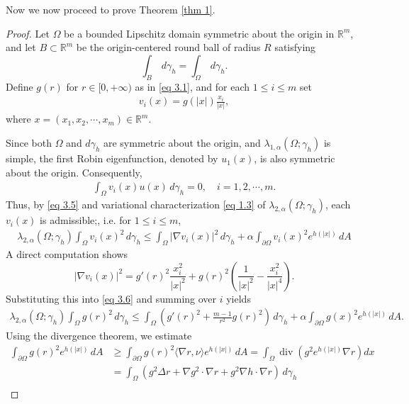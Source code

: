 \documentclass[11pt,leqno]{amsart}
\def\a{\alpha}
\def\l{\lambda}
\def\p{\partial}
\def\R{\mathbb{R}}
\def\div{\operatorname{div}}
\def \p {\partial}
\numberwithin{equation}{section}
\begin{document}
Now we now proceed to prove Theorem \ref{thm 1}.
\begin{proof}
 Let $\Omega$ be a bounded Lipschitz domain symmetric about the origin in $\R^m$, and let $B\subset \R^m$ be the origin-centered round ball of radius $R$ satisfying 
 $$
\int_B \, d\gamma_h =\int_\Omega \, d\gamma_h.
 $$
Define $g(r)$ for $r\in [0, +\infty)$ as in \eqref{eq 3.1}, and for each $1\le i\le m$ set
\begin{align*}
    v_i(x)=g(|x|)\frac{x_i}{|x|}, 
\end{align*}
where $x=(x_1, x_2, \cdots, x_m)\in \R^m$.

Since  both $\Omega$ and $d\gamma_h$ are symmetric about the origin, and $\l_{1, \a}(\Omega;\gamma_h)$ is simple,  the first Robin eigenfunction, denoted by $u_1(x)$, is also symmetric about the origin. Consequently,
     \begin{align}\label{eq 3.5}
        \int_\Omega v_i(x)u(x)   \, d\gamma_h=0, \quad i=1,2,\cdots, m.
    \end{align}
Thus, by \eqref{eq 3.5} and variational characterization \eqref{eq 1.3} of $\l_{2, \a}(\Omega; \gamma_h)$, each $v_i(x)$ is admissible;, i.e. for $1\le i\le m$,
    \begin{align}\label{eq 3.6}
      \l_{2, \a}(\Omega; \gamma_h)  \int_{\Omega} v_i(x)^2 \, d\gamma_h \leq \int_{\Omega} |\nabla v_i(x) |^2 \, d\gamma_h+\a\int_{\p \Omega} v_i(x)^2e^{h(|x|)}\, dA
    \end{align}
A direct computation shows
\begin{equation*} 
        |\nabla v_i(x)|^2 = g'(r)^2 \frac{x_i^2}{|x|^2} + g(r)^2 (\frac 1 {|x|^2}-\frac{x_i^2}{|x|^4}).
\end{equation*}  
Substituting this into  \eqref{eq 3.6} and summing over $i$ yields
    \begin{align}\label{eq 3.7}
          \l_{2, \a}(\Omega; \gamma_h)  \int_{\Omega} g(r)^2\, d\gamma_h
\leq \int_{\Omega}  \left(g'(r)^2+\frac{m-1}{r^2}g(r)^2\right) \, d\gamma_h+\a\int_{\p \Omega} g(x)^2e^{h(|x|)}\, dA.
    \end{align}
Using the divergence theorem, we estimate 
\begin{align}\label{eq 3.8}
    \int_{\partial \Omega}g(r)^2 e^{h(|x|)}\, dA&\geq \int_{\partial \Omega}g(r)^2\langle \nabla r, \nu \rangle e^{h(|x|)}\, dA=\int_{\Omega}\div (g^{2}e^{h(|x|)}\nabla r)dx\nonumber\\
    &=\int_{\Omega}\left(g^{2}\Delta r+\nabla g^{2}\cdot\nabla r+g^{2}\nabla h \cdot \nabla r\right)\, d\gamma_h\nonumber\\

\end{align}
\end{proof}
\end{document}
